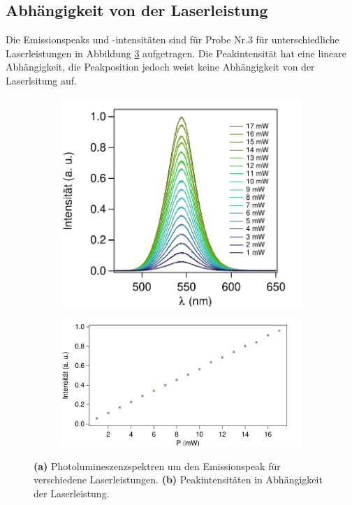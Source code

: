 \subsection{Abhängigkeit von der Laserleistung}
Die Emissionspeaks und -intensitäten sind für Probe Nr.3 für unterschiedliche Laserleistungen in Abbildung \ref{fig:Leistung} aufgetragen. 
Die Peakintensität hat eine lineare Abhängigkeit, die Peakposition jedoch weist keine Abhängigkeit von der Laserlsitung auf.
\begin{figure}[H]
    \centering
    \begin{subfigure}{0.375\textwidth}
        \includegraphics[width=\textwidth]{bilder/A2_Int.pdf}
        \caption{}
        \label{fig:A1}
    \end{subfigure}
    \begin{subfigure}{0.6\textwidth}
        \includegraphics[width=\textwidth]{bilder/Int.pdf}
        \caption{}
        \label{fig:A2}
    \end{subfigure}
    \caption{\textbf{(a)} Photolumineszenzspektren um den Emissionspeak für verschiedene Laserleistungen. \textbf{(b)} Peakintensitäten in Abhängigkeit der Laserleistung.}
    \label{fig:Leistung}
\end{figure}
